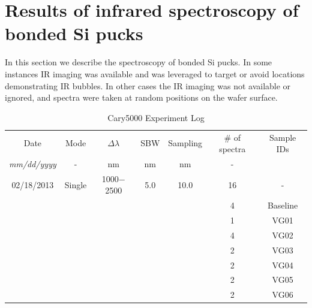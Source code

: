 \documentclass[osajnl,preprint,showpacs,superscriptaddress,12pt]{revtex4-1} %
\begin{document}
\section{Results of infrared spectroscopy of bonded Si pucks}
\label{secResults}
In this section we describe the spectroscopy of bonded Si pucks.  In some instances IR imaging was available and was leveraged to target or avoid locations demonstrating IR bubbles.  In other cases the IR imaging was not available or ignored, and spectra were taken at random positions on the wafer surface.  

\begin{table}[h!]
\caption{Cary5000 Experiment Log \label{tabExperiments}}
\begin{center}
    \begin{tabular}{c c c c c c c}
    \hline
	Date &  Mode  & $\Delta \lambda$ & SBW & Sampling & \# of spectra & Sample IDs \\
	\emph{mm/dd/yyyy} &  -  & nm & nm & nm & - \\
     \hline		
     	02/18/2013 & Single & 1000$-$2500 & 5.0 & 10.0 &  16 &   -  \\
     	                   &            &                       &       &         &    4 &  Baseline\\	
     	                   &            &                       &       &         &    1 &  VG01\\
	                   &            &                       &       &         &    4 &  VG02\\	                   
	                   &            &                       &       &         &    2 &  VG03\\	                   
	                   &            &                       &       &         &    2 &  VG04\\
	                   &            &                       &       &         &    2 &  VG05\\	                   
	                   &            &                       &       &         &    2 &  VG06\\
    \hline

\end{tabular}
\end{center}
\end{table}
\end{document}
